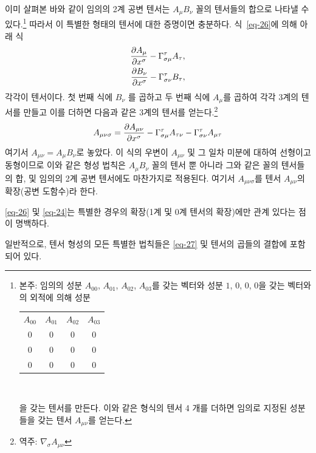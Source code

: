 이미 살펴본 바와 같이 임의의 2계 공변 텐서는 $A_\mu B_\nu$ 꼴의 텐서들의 합으로 나타낼 수 있다.\footnote{본주: 임의의 성분 $A_{0 0}$, $A_{0 1}$, $A_{0 2}$, $A_{0 3}$를 갖는 벡터와 성분 $1$, $0$, $0$, $0$을 갖는 벡터와의 외적에 의해 성분 
	
	\hfill \begin{tabular}{cccc}
		$A_{0 0}$ & $A_{0 1}$ & $A_{0 2}$ & $A_{0 3}$\\
		0 & 0 & 0 & 0\\
		0 & 0 & 0 & 0\\
		0 & 0 & 0 & 0\\
	\end{tabular} \hfill\,
	
	\noindent 을 갖는 텐서를 만든다. 이와 같은 형식의 텐서 4 개를 더하면 임의로 지정된 성분들을 갖는 텐서  $A_{\mu\nu}$를 얻는다.} 따라서 이 특별한 형태의 텐서에 대한 증명이면 충분하다. 식~\eqref{eq-26}에 의해 아래 식
\begin{align*}
	{\frac{{\partial}{A_\mu}}{{\partial}{x^\sigma}}}  
	- \Gamma_{\sigma\mu}^\tau A_\tau, \\
	{\frac{{\partial}{B_\nu}}{{\partial}{x^\sigma}}}  
	- \Gamma_{\sigma\nu}^\tau B_\tau,
\end{align*}
각각이 텐서이다. 첫 번째 식에 $ B_\nu $ 를 곱하고 두 번째 식에 $ A_\mu $를 곱하여 각각 3계의 텐서를 만들고 이를 더하면 다음과 같은 3계의 텐서를 얻는다.\footnote{역주: $\nabla_\sigma A_{\mu\nu}$}
\begin{equation} \label{eq-27}
	A_{\mu\nu\sigma} = {\frac{{\partial}{A_{\mu\nu}}}{{\partial}{x^\sigma}}}  
	- \Gamma_{\sigma\mu}^\tau A_{\tau\nu} - \Gamma_{\sigma\nu}^\tau A_{\mu\tau}
\end{equation}
여기서 $A_{\mu\nu}=A_\mu B_\nu$로 놓았다. 이 식의 우변이 $A_{\mu\nu}$ 및 그 일차 미분에 대하여 선형이고 동형이므로 이와 같은 형성 법칙은 $A_\mu B_\nu$ 꼴의 텐서 뿐 아니라 그와 같은 꼴의 텐서들의 합, 및 임의의 2계 공변 텐서에도 마찬가지로 적용된다.
여기서 $A_{\mu\nu\sigma}$를 텐서 $A_{\mu\nu}$의 확장(공변 도함수)라 한다.

\eqref{eq-26} 및 \eqref{eq-24}는 특별한 경우의 확장(1계 및 0계 텐서의 확장)에만 관계 있다는 점이 명백하다.

일반적으로, 텐서 형성의 모든 특별한 법칙들은 \eqref{eq-27} 및 텐서의 곱들의 결합에 포함되어 있다. 

